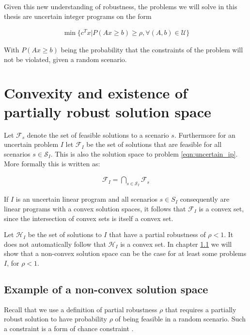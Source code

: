 Given this new understanding of robustness, the problems we will solve
in this thesis are uncertain integer programs on the form

\begin{eqnarray}
\label{eqn:chance_constrained_ip}
\min \lbrace c^T x \vert P(Ax\geq b) \geq \rho, \forall(A,b) \in \mathcal{U} \rbrace
\end{eqnarray}

With $P(Ax\geq b)$ being the probability that the constraints of the
problem will not be violated, given a random scenario.

\section{Convexity and existence of partially robust solution space}
\label{sec:non_convexity}

Let $\mathcal{F}_s$ denote the set of feasible solutions to a scenario
$s$. Furthermore for an uncertain problem $I$ let $\mathcal{F}_I$ be
the set of solutions that are feasible for all scenarios $s \in
\mathcal{S}_I$. This is also the solution space to problem
\ref{eqn:uncertain_ip}. More formally this is written as:

\begin{eqnarray}
\mathcal{F}_I  = \bigcap_{s \in \mathcal{S}_I} \mathcal{F}_s
\end{eqnarray}

If $I$ is an uncertain linear program and all scenarios $s \in S_I$ consequently are linear programs with a convex solution
spaces, it follows that $\mathcal{F}_I$ is a
convex set, since the intersection of convex sets is itself a convex
set.

Let $\mathcal{H}_I$ be the set of solutions to $I$ that have a partial
robustness of $\rho < 1$. It does not automatically follow that
$\mathcal{H}_I$ is a convex set. In chapter
\ref{sec:non_convex_example} we will show that a non-convex solution
space can be the case for at least some problems $I$, for $\rho < 1$.

\subsection{Example of a non-convex solution space}
\label{sec:non_convex_example}

Recall that we use a definition of partial robustness $\rho$ that requires a
partially robust solution to have probability $\rho$ of being feasible
in a random scenario. Such a constraint is a form of chance constraint
\cite{kallwallace}.

